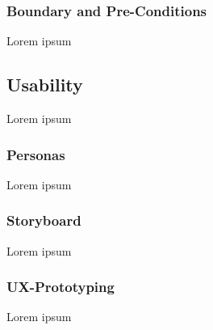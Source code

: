 \subsubsection{Boundary and Pre-Conditions}
Lorem ipsum

\subsection{Usability}
Lorem ipsum

\subsubsection{Personas}
Lorem ipsum

\subsubsection{Storyboard}
Lorem ipsum

\subsubsection{UX-Prototyping}
Lorem ipsum